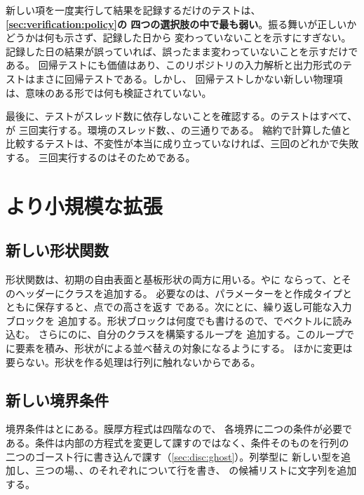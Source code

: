 \begin{warn}[回帰テストだけで済ませない]
  新しい項を一度実行して結果を記録するだけのテストは、\textbf{\cref{sec:verification:policy}の
  四つの選択肢の中で最も弱い}。振る舞いが正しいかどうかは何も示さず、記録した日から
  変わっていないことを示すにすぎない。記録した日の結果が誤っていれば、誤ったまま変わっていないことを示すだけである。
  回帰テストにも価値はあり、このリポジトリの入力解析と出力形式のテストはまさに回帰テストである。しかし、
  回帰テストしかない新しい物理項は、意味のある形では何も検証されていない。
\end{warn}

最後に、テストがスレッド数に依存しないことを確認する。のテストはすべて、が
三回実行する。環境のスレッド数、、の三通りである。
縮約で計算した値と比較するテストは、不変性が本当に成り立っていなければ、三回のどれかで失敗する。
三回実行するのはそのためである。

\section{より小規模な拡張}
\label{sec:extending:other}

\subsection{新しい形状関数}

形状関数は、初期の自由表面と基板形状の両方に用いる。やに
ならって、とそのヘッダーにクラスを追加する。
必要なのは、パラメーターをと作成タイプとともに保存すると、点での高さを返す
である。次にとに、繰り返し可能な入力ブロックを
追加する。形状ブロックは何度でも書けるので、でベクトルに読み込む。
さらにのに、自分のクラスを構築するループを
追加する。このループでに要素を積み、形状がによる並べ替えの対象になるようにする。
ほかに変更は要らない。形状を作る処理は行列に触れないからである。

\subsection{新しい境界条件}

境界条件はとにある。膜厚方程式は四階なので、
各境界に二つの条件が必要である。条件は内部の方程式を変更して課すのではなく、条件そのものを行列の
二つのゴースト行に書き込んで課す（\cref{sec:disc:ghost}）。列挙型に
新しい型を追加し、三つの場、、のそれぞれについて行を書き、
の候補リストに文字列を追加する。

